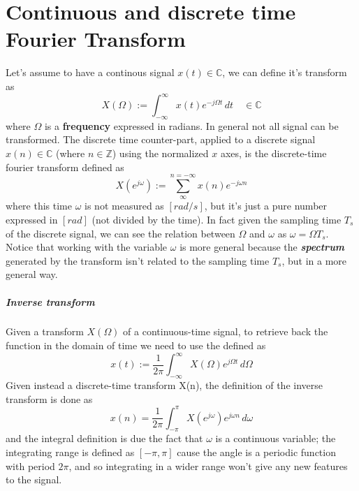\chapter{Continuous and discrete time Fourier Transform}
	
	Let's assume to have a continous signal $x(t) \in \mathds C$, we can define it's transform as
	\begin{equation}
		X(\Omega) := \int_{-\infty}^{\infty} x(t) e^{-j\Omega t} \, dt \quad \in \mathds C
	\end{equation}
	where $\Omega$ is a \textbf{frequency} expressed in radians. In general not all signal can be transformed. The discrete time counter-part, applied to a discrete signal $x(n) \in \mathds C$ (where $n\in \mathds Z$) using the normalized $x$ axes, is the discrete-time fourier transform defined as
	\begin{equation}
		X\left(e^{j\omega}\right) := \sum_{\infty}^{n = - \infty} x(n) e^{-j\omega n}
	\end{equation}
	where this time $\omega$ is not measured as $[rad/s]$, but it's just a pure number expressed in $[rad]$ (not divided by the time). In fact given the sampling time $T_s$ of the discrete signal, we can see the relation between $\Omega$ and $\omega$ as $\omega = \Omega T_s$. Notice that working with the variable $\omega$ is more general because the \textbf{\textit{spectrum}} generated by the transform isn't related to the sampling time $T_s$, but in a more general way.
	
	\paragraph{Inverse transform} Given a transform $X(\Omega)$ of a continuous-time signal, to retrieve back the function in the domain of time we need to use the  defined as
	\begin{equation}
		x(t) := \frac 1 {2\pi} \int_{-\infty}^\infty X(\Omega) e^{j\Omega t} \, d\Omega
	\end{equation}
	Given instead a discrete-time transform X(n), the definition of the inverse transform is done as
	\begin{equation}
		x(n) = \frac 1{2\pi} \int_{-\pi}^\pi X\left(e^{j\omega}\right) e^{j\omega n}\, d\omega
	\end{equation}
	and the integral definition is due the fact that $\omega$ is a continuous variable; the integrating range is defined as $[-\pi,\pi]$ cause the angle is a periodic function with period $2\pi$, and so integrating in a wider range won't give any new features to the signal.
	
